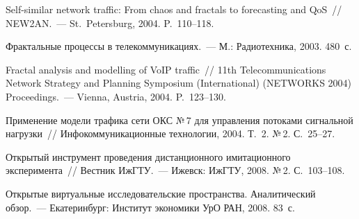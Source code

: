 \begin{multicols}{2}
{{\begin{thebibliography}{9}
 Self-similar network traffic: From chaos and fractals to forecasting 
and QoS~// NEW2AN.~--- St.\ Petersburg, 2004. P.~110--118.

Фрактальные процессы в телекоммуникациях.~--- М.: Радиотехника, 2003. 
480~с.

Fractal analysis and modelling of VoIP traffic~// 11th  Telecommunications Network 
Strategy and Planning Symposium (International) (NETWORKS 2004) 
Proceedings.~--- Vienna, Austria, 2004. P.~123--130.

Применение модели трафика сети ОКС №\,7 для управления потоками 
сигнальной нагрузки~// Инфокоммуникационные технологии, 2004. Т.~2. №\,2. 
С.~25--27.

Открытый инструмент проведения дистанционного имитационного 
эксперимента~// Вестник ИжГТУ.~--- Ижевск: ИжГТУ, 2008. №\,2. 
С.~103--108.

\label{end\stat}

Открытые виртуальные исследовательские пространства. Аналитический 
обзор.~--- Екатеринбург: Институт экономики УрО РАН, 2008. 83~с.
 \end{thebibliography}
}
}


\end{multicols}